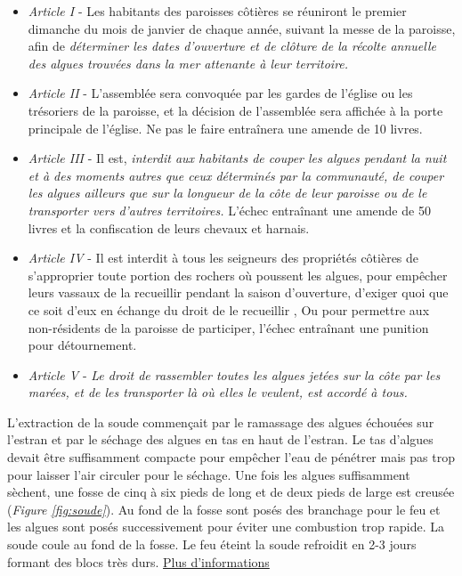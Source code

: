 \documentclass[
]{book}
\begin{document}
\begin{itemize}
\item
  \emph{Article I} - Les habitants des paroisses côtières se réuniront le premier dimanche du mois de janvier de chaque année, suivant la messe de la paroisse, afin de \emph{déterminer les dates d'ouverture et de clôture de la récolte annuelle des algues trouvées dans la mer attenante à leur territoire.}
\item
  \emph{Article II} - L'assemblée sera convoquée par les gardes de l'église ou les trésoriers de la paroisse, et la décision de l'assemblée sera affichée à la porte principale de l'église. Ne pas le faire entraînera une amende de 10 livres.
\item
  \emph{Article III} - Il est, \emph{interdit aux habitants de couper les algues pendant la nuit et à des moments autres que ceux déterminés par la communauté, de couper les algues ailleurs que sur la longueur de la côte de leur paroisse ou de le transporter vers d'autres territoires.} L'échec entraînant une amende de 50 livres et la confiscation de leurs chevaux et harnais.
\item
  \emph{Article IV} - Il est interdit à tous les seigneurs des propriétés côtières de s'approprier toute portion des rochers où poussent les algues, pour empêcher leurs vassaux de la recueillir pendant la saison d'ouverture, d'exiger quoi que ce soit d'eux en échange du droit de le recueillir , Ou pour permettre aux non-résidents de la paroisse de participer, l'échec entraînant une punition pour détournement.
\item
  \emph{Article V} - \emph{Le droit de rassembler toutes les algues jetées sur la côte par les marées, et de les transporter là où elles le veulent, est accordé à tous.}
\end{itemize}

L'extraction de la soude commençait par le ramassage des algues échouées sur l'estran et par le séchage des algues en tas en haut de l'estran. Le tas d'algues devait être suffisamment compacte pour empêcher l'eau de pénétrer mais pas trop pour laisser l'air circuler pour le séchage. Une fois les algues suffisamment sèchent, une fosse de cinq à six pieds de long et de deux pieds de large est creusée (\emph{Figure \ref{fig:soude}}). Au fond de la fosse sont posés des branchage pour le feu et les algues sont posés successivement pour éviter une combustion trop rapide. La soude coule au fond de la fosse. Le feu éteint la soude refroidit en 2-3 jours formant des blocs très durs. \href{http://patrimoinedesabers.fr/de/landeda/histoires/214-historique-des-fours-a-goemon.html}{Plus d'informations}
\end{document}
